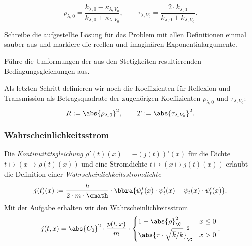\documentclass{subfiles}
\begin{document}
        \[
            \rho_{\lambda,0} = \frac{k_{\lambda,0} - \kappa_{\lambda,V_0}}{k_{\lambda,0} + \kappa_{\lambda,V_0}},\qquad \tau_{\lambda,V_0} = \frac{2\cdot k_{\lambda,0}}{k_{\lambda,0} + k_{\lambda,V_0}}.
        \]
        \begin{Aufgabe}
            \nr{} Schreibe die aufgestellte Lösung für das Problem mit allen Definitionen einmal sauber aus und markiere die reellen und imaginären Exponentialargumente.
            
            \nr{} Führe die Umformungen der aus den Stetigkeiten resultierenden Bedingungsgleichungen aus. 



        \end{Aufgabe}
        \noindent Als letzten Schritt definieren wir noch die Koeffizienten für Reflexion und Transmission als Betragsquadrate der zugehörigen Koeffizienten $\rho_{\lambda,0}$ und $\tau_{\lambda,V_0}$:
        \[
            R := \abs{\rho_{\lambda,0}}^2, \qquad T := \abs{\tau_{\lambda,V_0}}^2.
        \]
        \subsubsection*{Wahrscheinlichkeitsstrom}
            Die \emph{Kontinuitätsgleichung} $\rho'(t)(x) = -(j(t))'(x)$ für die Dichte $t\mapsto (x\mapsto \rho(t)(x))$ und eine Stromdichte $t\mapsto (x\mapsto j(t)(x))$ erlaubt die Definition einer \emph{Wahrscheinlichkeitsstromdichte} 
            \[
                j(t)(x) := \frac{\hbar}{2\cdot m\cdot\cmath}\cdot\bbra{
                    \psi^*_t(x)\cdot\psi_t'(x) - \psi_t(x)\cdot\psi_t'(x)
                }.
            \]
            Mit der Aufgabe erhalten wir den Wahrscheinlichkeitsstrom
            \[j(t,x) = \abs{C_0}^2\cdot \frac{p(t,x)}{m}\cdot\begin{cases}
                1-\abs{\rho}_\C^2 & x \leq 0 \\
                \abs{\tau\cdot \sqrt{\overline k/k}}_\C^2 & x > 0
            \end{cases}.\]
        
\end{document}
